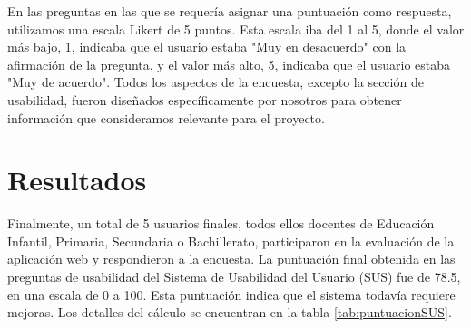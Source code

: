 En las preguntas en las que se requería asignar una puntuación como respuesta, utilizamos una escala Likert de 5 puntos. Esta escala iba del 1 al 5, donde el valor más bajo, 1, indicaba que el usuario estaba "Muy en desacuerdo" con la afirmación de la pregunta, y el valor más alto, 5, indicaba que el usuario estaba "Muy de acuerdo". Todos los aspectos de la encuesta, excepto la sección de usabilidad, fueron diseñados específicamente por nosotros para obtener información que consideramos relevante para el proyecto.

\section{Resultados}\label{sec:resultadosEvaluacion}
Finalmente, un total de 5 usuarios finales, todos ellos docentes de Educación Infantil, Primaria, Secundaria o Bachillerato, participaron en la evaluación de la aplicación web y respondieron a la encuesta. La puntuación final obtenida en las preguntas de usabilidad del Sistema de Usabilidad del Usuario (SUS) fue de 78.5, en una escala de 0 a 100. Esta puntuación indica que el sistema todavía requiere mejoras. Los detalles del cálculo se encuentran en la tabla \ref{tab:puntuacionSUS}.

